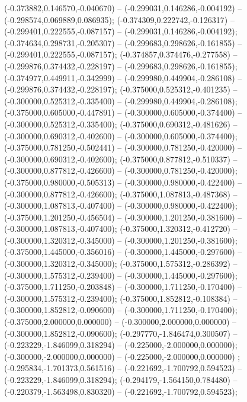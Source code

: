  (-0.373882,0.146570,-0.040670) -- (-0.299031,0.146286,-0.004192) -- (-0.298574,0.069889,0.086935);
 (-0.374309,0.222742,-0.126317) -- (-0.299401,0.222555,-0.087157) -- (-0.299031,0.146286,-0.004192);
 (-0.374634,0.298731,-0.205307) -- (-0.299683,0.298626,-0.161855) -- (-0.299401,0.222555,-0.087157);
 (-0.374857,0.374476,-0.277558) -- (-0.299876,0.374432,-0.228197) -- (-0.299683,0.298626,-0.161855);
 (-0.374977,0.449911,-0.342999) -- (-0.299980,0.449904,-0.286108) -- (-0.299876,0.374432,-0.228197);
 (-0.375000,0.525312,-0.401235) -- (-0.300000,0.525312,-0.335400) -- (-0.299980,0.449904,-0.286108);
 (-0.375000,0.605000,-0.447891) -- (-0.300000,0.605000,-0.374400) -- (-0.300000,0.525312,-0.335400);
 (-0.375000,0.690312,-0.481626) -- (-0.300000,0.690312,-0.402600) -- (-0.300000,0.605000,-0.374400);
 (-0.375000,0.781250,-0.502441) -- (-0.300000,0.781250,-0.420000) -- (-0.300000,0.690312,-0.402600);
 (-0.375000,0.877812,-0.510337) -- (-0.300000,0.877812,-0.426600) -- (-0.300000,0.781250,-0.420000);
 (-0.375000,0.980000,-0.505313) -- (-0.300000,0.980000,-0.422400) -- (-0.300000,0.877812,-0.426600);
 (-0.375000,1.087813,-0.487368) -- (-0.300000,1.087813,-0.407400) -- (-0.300000,0.980000,-0.422400);
 (-0.375000,1.201250,-0.456504) -- (-0.300000,1.201250,-0.381600) -- (-0.300000,1.087813,-0.407400);
 (-0.375000,1.320312,-0.412720) -- (-0.300000,1.320312,-0.345000) -- (-0.300000,1.201250,-0.381600);
 (-0.375000,1.445000,-0.356016) -- (-0.300000,1.445000,-0.297600) -- (-0.300000,1.320312,-0.345000);
 (-0.375000,1.575312,-0.286392) -- (-0.300000,1.575312,-0.239400) -- (-0.300000,1.445000,-0.297600);
 (-0.375000,1.711250,-0.203848) -- (-0.300000,1.711250,-0.170400) -- (-0.300000,1.575312,-0.239400);
 (-0.375000,1.852812,-0.108384) -- (-0.300000,1.852812,-0.090600) -- (-0.300000,1.711250,-0.170400);
 (-0.375000,2.000000,0.000000) -- (-0.300000,2.000000,0.000000) -- (-0.300000,1.852812,-0.090600);
 (-0.297770,-1.846474,0.300507) -- (-0.223229,-1.846099,0.318294) -- (-0.225000,-2.000000,0.000000);
 (-0.300000,-2.000000,0.000000) -- (-0.225000,-2.000000,0.000000) ;
 (-0.295834,-1.701373,0.561516) -- (-0.221692,-1.700792,0.594523) -- (-0.223229,-1.846099,0.318294);
 (-0.294179,-1.564150,0.784480) -- (-0.220379,-1.563498,0.830320) -- (-0.221692,-1.700792,0.594523);
